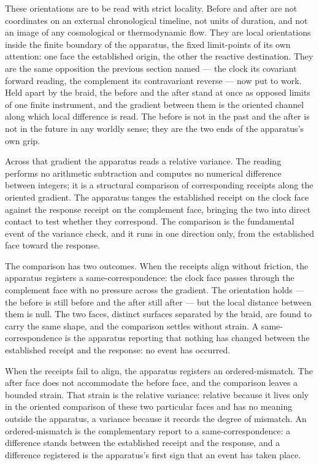 These orientations are to be read with strict locality. Before and after are not coordinates on an external chronological timeline, not units of duration, and not an image of any cosmological or thermodynamic flow. They are local orientations inside the finite boundary of the apparatus, the fixed limit-points of its own attention: one face the established origin, the other the reactive destination. They are the same opposition the previous section named --- the clock its covariant forward reading, the complement its contravariant reverse --- now put to work. Held apart by the braid, the before and the after stand at once as opposed limits of one finite instrument, and the gradient between them is the oriented channel along which local difference is read. The before is not in the past and the after is not in the future in any worldly sense; they are the two ends of the apparatus's own grip.

Across that gradient the apparatus reads a relative variance. The reading performs no arithmetic subtraction and computes no numerical difference between integers; it is a structural comparison of corresponding receipts along the oriented gradient. The apparatus tanges the established receipt on the clock face against the response receipt on the complement face, bringing the two into direct contact to test whether they correspond. The comparison is the fundamental event of the variance check, and it runs in one direction only, from the established face toward the response.

The comparison has two outcomes. When the receipts align without friction, the apparatus registers a same-correspondence: the clock face passes through the complement face with no pressure across the gradient. The orientation holds --- the before is still before and the after still after --- but the local distance between them is null. The two faces, distinct surfaces separated by the braid, are found to carry the same shape, and the comparison settles without strain. A same-correspondence is the apparatus reporting that nothing has changed between the established receipt and the response: no event has occurred.

When the receipts fail to align, the apparatus registers an ordered-mismatch. The after face does not accommodate the before face, and the comparison leaves a bounded strain. That strain is the relative variance: relative because it lives only in the oriented comparison of these two particular faces and has no meaning outside the apparatus, a variance because it records the degree of mismatch. An ordered-mismatch is the complementary report to a same-correspondence: a difference stands between the established receipt and the response, and a difference registered is the apparatus's first sign that an event has taken place.

